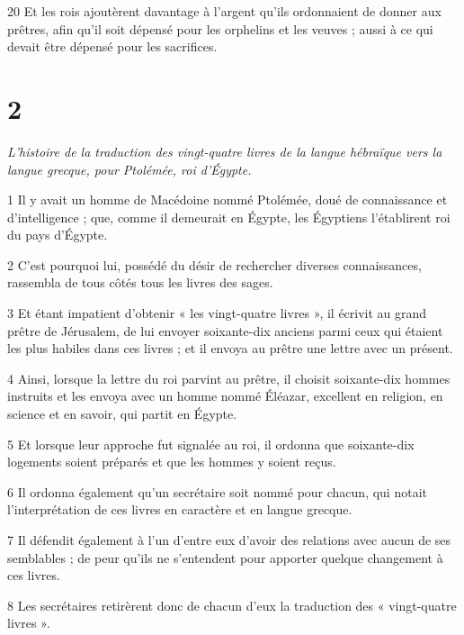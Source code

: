 \par 20 Et les rois ajoutèrent davantage à l'argent qu'ils ordonnaient de donner aux prêtres, afin qu'il soit dépensé pour les orphelins et les veuves ; aussi à ce qui devait être dépensé pour les sacrifices.

\chapter{2}

\par \textit{L'histoire de la traduction des vingt-quatre livres de la langue hébraïque vers la langue grecque, pour Ptolémée, roi d'Égypte.}

\par 1 Il y avait un homme de Macédoine nommé Ptolémée, doué de connaissance et d'intelligence ; que, comme il demeurait en Égypte, les Égyptiens l'établirent roi du pays d'Égypte.

\par 2 C'est pourquoi lui, possédé du désir de rechercher diverses connaissances, rassembla de tous côtés tous les livres des sages.

\par 3 Et étant impatient d'obtenir « les vingt-quatre livres », il écrivit au grand prêtre de Jérusalem, de lui envoyer soixante-dix anciens parmi ceux qui étaient les plus habiles dans ces livres ; et il envoya au prêtre une lettre avec un présent.

\par 4 Ainsi, lorsque la lettre du roi parvint au prêtre, il choisit soixante-dix hommes instruits et les envoya avec un homme nommé Éléazar, excellent en religion, en science et en savoir, qui partit en Égypte.

\par 5 Et lorsque leur approche fut signalée au roi, il ordonna que soixante-dix logements soient préparés et que les hommes y soient reçus.

\par 6 Il ordonna également qu'un secrétaire soit nommé pour chacun, qui notait l'interprétation de ces livres en caractère et en langue grecque.

\par 7 Il défendit également à l'un d'entre eux d'avoir des relations avec aucun de ses semblables ; de peur qu’ils ne s’entendent pour apporter quelque changement à ces livres.

\par 8 Les secrétaires retirèrent donc de chacun d'eux la traduction des « vingt-quatre livres ».

